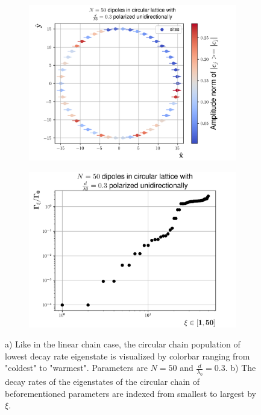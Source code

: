 \documentclass{article}
\begin{document}
\begin{figure}[H]
    \centering
    \begin{subfigure}[b]{0.49\textwidth}
        \includegraphics[width=\textwidth]{figs/dipoles_case_circular_unidirectional_lowest.png}
        \caption{}
        \label{fig:circular_lowest_eigenstate}
    \end{subfigure}
    \hfill
    \begin{subfigure}[b]{0.49\textwidth}
        \includegraphics[width=\textwidth]{figs/case_circular_unidirectional_d_03.png}
        \caption{}
        \label{fig:circular_unidirectional_decayrates}
    \end{subfigure}
    \caption{a) Like in the linear chain case, the circular chain population of lowest decay rate eigenstate is visualized by colorbar ranging from "coldest" to "warmest". Parameters are $N=50$ and $\frac{d}{\lambda_0}= 0.3$. b) The decay rates of the eigenstates of the circular chain of beforementioned parameters are indexed from smallest to largest by $\xi$. }
    \label{fig:circular}
\end{figure}
\end{document}
